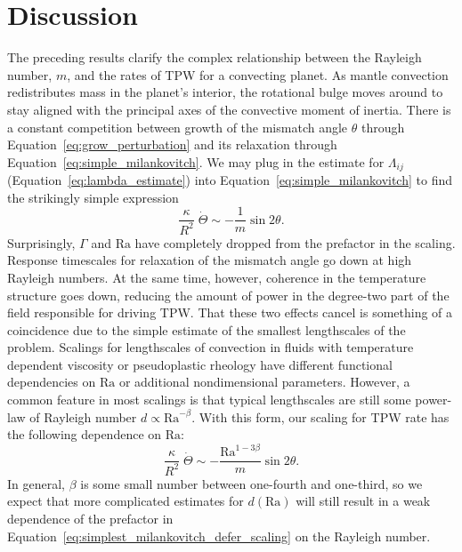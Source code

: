 \documentclass[extra,mreferee]{gji}
\begin{document}
\section{Discussion}
\label{sec:discussion}

The preceding results clarify the complex relationship between the Rayleigh number, $m$, and the rates of TPW for a convecting planet.
As mantle convection redistributes mass in the planet's interior, the rotational bulge moves around to stay aligned with the principal axes of the convective moment of inertia. 
There is a constant competition between growth of the mismatch angle $\theta$ through 
Equation~\eqref{eq:grow_perturbation} and its relaxation through Equation~\eqref{eq:simple_milankovitch}.
We may plug in the estimate for $\Lambda_{ij}$ (Equation~\eqref{eq:lambda_estimate}) into Equation~\eqref{eq:simple_milankovitch} to find the strikingly simple expression
\begin{equation}
\frac{\kappa}{R^2} \; \dot{\Theta} \sim -\frac{1}{m} \sin{2 \theta}.
\label{eq:simplest_milankovitch}
\end{equation}
Surprisingly, $\Gamma$ and $\mathrm{Ra}$ have completely dropped from the prefactor in the scaling. 
Response timescales for relaxation of the mismatch angle go down at high Rayleigh numbers.
At the same time, however, coherence in the temperature structure goes down, reducing the amount of power in the degree-two part of the field responsible for driving TPW.
That these two effects cancel is something of a coincidence due to the simple estimate of the smallest lengthscales of the problem.
Scalings for lengthscales of convection in fluids with temperature dependent viscosity \citep[e.g.][]{solomatov1995scaling} or pseudoplastic rheology \citep[e.g.][]{korenaga2010scaling} have different functional dependencies on $\mathrm{Ra}$ or additional nondimensional parameters.
However, a common feature in most scalings is that typical lengthscales are still some power-law of Rayleigh number $d \propto \mathrm{Ra}^{-\beta}$.
With this form, our scaling for TPW rate has the following dependence on $\mathrm{Ra}$:
\begin{equation}
\frac{\kappa}{R^2} \; \dot{\Theta} \sim -\frac{\mathrm{Ra}^{1-3\beta}}{m} \sin{2 \theta}.
\label{eq:simplest_milankovitch_defer_scaling}
\end{equation}
In general, $\beta$ is some small number between one-fourth and one-third, so we expect that more complicated estimates for 
$d(\mathrm{Ra})$ will still result in a weak dependence of the prefactor in Equation~\eqref{eq:simplest_milankovitch_defer_scaling} 
on the Rayleigh number.
\end{document}
